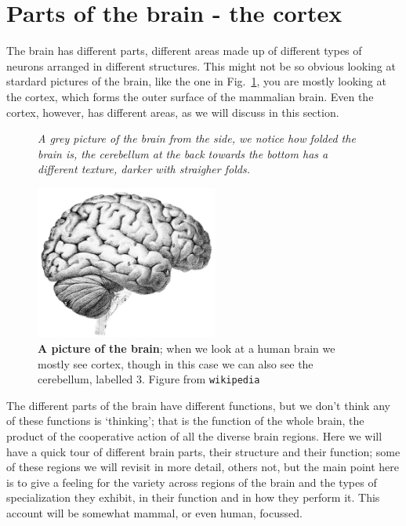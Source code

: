 \documentclass[12pt]{article}
\begin{document}
\section*{Parts of the brain - the cortex}

The brain has different parts, different areas made up of different
types of neurons arranged in different structures. This might not be
so obvious looking at stardard pictures of the brain, like the one in
Fig.~\ref{fig_brain}, you are mostly looking at the cortex, which
forms the outer surface of the mammalian brain. Even the cortex,
however, has different areas, as we will discuss in this section.

\begin{figure}[tbhp]
           {\textsl{A grey picture of the brain from the side, we notice how folded the brain is, the cerebellum at the back towards the bottom has a different texture, darker with straigher folds.}}
{
  \begin{center}
  \includegraphics[width=6cm]{brain.jpg}
  \end{center}
  }
  \caption{\textbf{A picture of the brain}; when we look at a human
    brain we mostly see cortex, though in this case we can also see
    the cerebellum, labelled 3. Figure from
    \texttt{wikipedia}\label{fig_brain}}
\end{figure}

The different parts of the brain have different functions, but we
don't think any of these functions is `thinking'; that is the function
of the whole brain, the product of the cooperative action of all the
diverse brain regions. Here we will have a quick tour of different
brain parts, their structure and their function; some of these regions
we will revisit in more detail, others not, but the main point here is
to give a feeling for the variety across regions of the brain and the
types of specialization they exhibit, in their function and in how
they perform it. This account will be somewhat mammal, or even human,
focussed.
\end{document}
